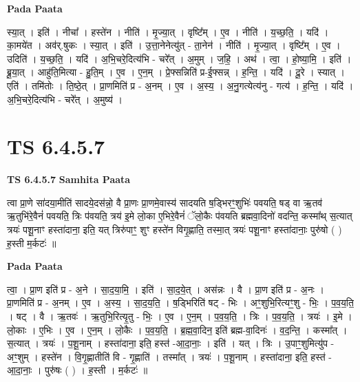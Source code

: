\documentclass[17pt]{extarticle}
\begin{document}
\textbf{Pada Paata} \newline

स्या॒त् । इति॑ । नीचा᳚ । हस्ते॑न । नीति॑ । मृ॒ज्या॒त् । वृष्टि᳚म् । ए॒व । नीति॑ । य॒च्छ॒ति॒ । यदि॑ । का॒मये॑त । अव॑र्.षुकः । स्या॒त् । इति॑ । उ॒त्ता॒नेनेत्यु॑त् - ता॒नेन॑ । नीति॑ । मृ॒ज्या॒त् । वृष्टि᳚म् । ए॒व । उदिति॑ । य॒च्छ॒ति॒ । यदि॑ । अ॒भि॒चरे॒दित्य॑भि - चरे᳚त् । अ॒मुम् । ज॒हि॒ । अथ॑ । त्वा॒ । हो॒ष्या॒मि॒ । इति॑ । ब्रू॒या॒त् । आहु॑ति॒मित्या - हु॒ति॒म् । ए॒व । ए॒न॒म् । प्रे॒फ्सन्निति॑ प्र-ई॒फ्सन्न् । ह॒न्ति॒ । यदि॑ । दू॒रे । स्यात् । एति॑ । तमि॑तोः । ति॒ष्ठे॒त् । प्रा॒णमिति॑ प्र - अ॒नम् । ए॒व । अ॒स्य॒ । अ॒नु॒गत्येत्य॑नु - गत्य॑ । ह॒न्ति॒ । यदि॑ । अ॒भि॒चरे॒दित्य॑भि - चरे᳚त् । अ॒मुष्य॑ ।  \newline





\section{ TS 6.4.5.7 }

\textbf{TS 6.4.5.7 } \newline
\textbf{Samhita Paata} \newline

त्वा प्रा॒णे सा॑दया॒मीति॑ सादये॒दस॑न्नो॒ वै प्रा॒णः प्रा॒णमे॒वास्य॑ सादयति ष॒ड्भिरꣳ॒॒शुभिः॑ पवयति॒ षड् वा ऋ॒तव॑ ऋ॒तुभि॑रे॒वैनं॑ पवयति॒ त्रिः प॑वयति॒ त्रय॑ इ॒मे लो॒का ए॒भिरे॒वैनं॑ ॅलो॒कैः प॑वयति ब्रह्मवा॒दिनो॑ वदन्ति॒ कस्मा᳚थ् स॒त्यात् त्रयः॑ पशू॒नाꣳ हस्ता॑दाना॒ इति॒ यत् त्रिरु॑पाꣳ॒॒ शुꣳ हस्ते॑न विगृ॒ह्णाति॒ तस्मा॒त् त्रयः॑ पशू॒नाꣳ हस्ता॑दानाः॒ पुरु॑षो ( ) ह॒स्ती म॒र्कटः॑ ॥ \newline

\textbf{Pada Paata} \newline

त्वा॒ । प्रा॒ण इति॑ प्र - अ॒ने । सा॒द॒या॒मि॒ । इति॑ । सा॒द॒ये॒त् । अस॑न्नः । वै । प्रा॒ण इति॑ प्र - अ॒नः । प्रा॒णमिति॑ प्र - अ॒नम् । ए॒व । अ॒स्य॒ । सा॒द॒य॒ति॒ । ष॒ड्भिरिति॑ षट् - भिः । अꣳ॒॒शुभि॒रित्यꣳ॒॒शु - भिः॒ । प॒व॒य॒ति॒ । षट् । वै । ऋ॒तवः॑ । ऋ॒तुभि॒रित्यृ॒तु - भिः॒ । ए॒व । ए॒न॒म् । प॒व॒य॒ति॒ । त्रिः । प॒व॒य॒ति॒ । त्रयः॑ । इ॒मे । लो॒काः । ए॒भिः । ए॒व । ए॒न॒म् । लो॒कैः । प॒व॒य॒ति॒ । ब्र॒ह्म॒वा॒दिन॒ इति॑ ब्रह्म-वा॒दिनः॑ । व॒द॒न्ति॒ । कस्मा᳚त् । स॒त्यात् । त्रयः॑ । प॒शू॒नाम् । हस्ता॑दाना॒ इति॒ हस्त॑ -आ॒दा॒नाः॒ । इति॑ । यत् । त्रिः । उ॒पाꣳ॒॒शुमित्यु॑प - अꣳ॒॒शुम् । हस्ते॑न । वि॒गृ॒ह्णातीति॑ वि - गृ॒ह्णाति॑ । तस्मा᳚त् । त्रयः॑ । प॒शू॒नाम् । हस्ता॑दाना॒ इति॒ हस्त॑ - आ॒दा॒नाः॒ । पुरु॑षः ( ) । ह॒स्ती । म॒र्कटः॑ ॥  \newline
\end{document}
